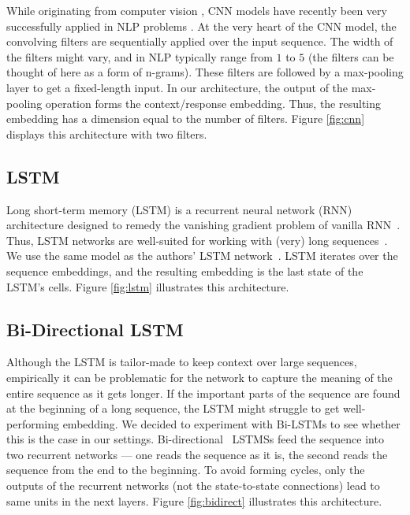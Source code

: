 \documentclass{article} \usepackage{nips15submit_e,times}
\newcommand{\MARTINSECOND}[1]{{\color{black}#1}} \newcommand{\MARTINTHIRD}[1]{{\color{black}#1}} \newcommand{\COPY}[1]{{\color{black}[#1]}}
\begin{document}
\MARTINSECOND
{ 
While originating from computer vision \cite{lecun1998gradient}, CNN models have
recently been very successfully applied in NLP problems \cite{kim2014convolutional}.
At the very heart of the CNN model, the convolving filters are sequentially applied over the input sequence.
The width of the filters might vary, and in NLP typically range from $1$ to $5$
(the filters can be thought of here as a form of n-grams).
These filters are followed by a max-pooling layer to get a fixed-length input.
In our architecture, the output of the max-pooling operation forms the context/response embedding.
Thus, the resulting embedding has a dimension equal to the number of filters.
Figure \ref{fig:cnn} displays this architecture with two filters.
}



\subsection{LSTM}
\MARTINTHIRD{
Long short-term memory (LSTM) is a recurrent neural network (RNN) architecture designed to remedy the vanishing gradient problem of vanilla RNN~\cite{Hochreiter1997}.
Thus, LSTM networks are well-suited for working with (very) long sequences~\cite{Gers2002}.
}
We use the same model as the authors' LSTM network~\cite{Lowe2015}.
LSTM iterates over the sequence embeddings, and the resulting embedding is the last state of the LSTM's cells.
Figure \ref{fig:lstm} illustrates this architecture.





\subsection{Bi-Directional LSTM}
Although the LSTM is tailor-made to keep context over large sequences,
empirically it can be problematic for the network to capture the meaning of the entire sequence as it gets
longer.
If the important parts of the sequence are found at the beginning of a long sequence, the LSTM might struggle to get well-performing embedding.
We decided to experiment with Bi-LSTMs to see whether this is the case in our settings.
Bi-directional~\cite{Schuster1997} LSTMSs feed the sequence into two recurrent networks --- one reads the sequence as it is, the second reads the sequence from the end to the beginning.
To avoid forming cycles, only the outputs of the recurrent networks (not the state-to-state connections) lead to same units in the next layers.
Figure \ref{fig:bidirect} illustrates this architecture.
\end{document}
